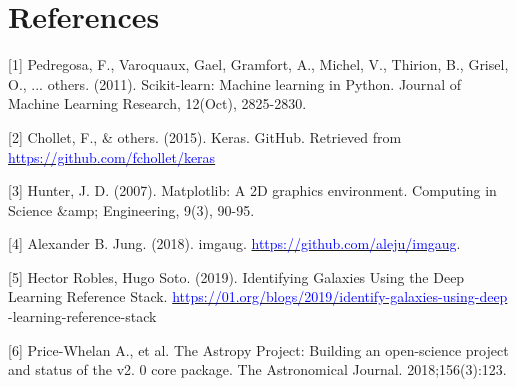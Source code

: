 \section*{References}
\label{sec:References}

[1] Pedregosa, F., Varoquaux, Gael, Gramfort, A., Michel, V., Thirion, B., Grisel, O., ... others. (2011). Scikit-learn: Machine learning in Python. Journal of Machine Learning Research, 12(Oct), 2825-2830.

[2] Chollet, F., \& others. (2015). Keras. GitHub. Retrieved from \href{https://github.com/fchollet/keras}{\textcolor{blue}{https://github.com/fchollet/keras}}

[3] Hunter, J. D. (2007). Matplotlib: A 2D graphics environment. Computing in Science \&amp; Engineering, 9(3), 90-95.

[4] Alexander B. Jung. (2018). imgaug. \href{https://github.com/aleju/imgaug}{\textcolor{blue}{https://github.com/aleju/imgaug}}.

[5] Hector Robles, Hugo Soto. (2019). Identifying Galaxies Using the Deep Learning Reference Stack. \href{https://01.org/blogs/2019/identify-galaxies-using-deep}{\textcolor{blue}{https://01.org/blogs/2019/identify-galaxies-using-deep}} -learning-reference-stack

[6] Price-Whelan A., et al. The Astropy Project: Building an open-science project and status of the v2. 0 core package. The Astronomical Journal. 2018;156(3):123.